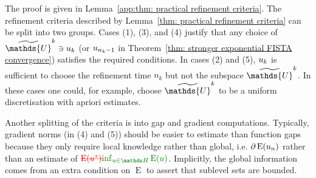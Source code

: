 \documentclass[smallextended]{svjour3}
\let\F\mathds\let\C\mathcal\newcommand{\R}{\F{R}}\newcommand{\A}{\tens{A}}
\newcommand{\op}[1]{\operatorname{#1}}
\newcommand{\1}{\F{1}}
\newcommand{\Emin}[1][\varf0]{\inf_{#1\in\F H}\op{E}(#1)}
\newcommand*{\varf}[1]{%
	\IfEqCase{#1}{%
		{0}{u}%
		{1}{v}%
		{2}{w}%
	}[u#1]%
}
\newcommand*{\spcf}[1]{%
	\IfEqCase{#1}{%
		{0}{\F{U}}%
		{1}{\F{V}}%
		{2}{\F{W}}%
	}[\F{U}#1]%
}
\newcommand{\edit}[2]{{\ifmmode\text{\color{red}\sout{\ensuremath{#1}}}\else {\color{red} \sout{#1}}\fi} {\color{darkgreen} #2}}
\begin{document}
	\noindent The proof is given in Lemma~\ref{app:thm: practical refinement criteria}. The refinement criteria described by Lemma~\ref{thm: practical refinement criteria} can be split into two groups. Cases (1), (3), and (4) justify that any choice of $\tilde{\spcf0}^k\ni\varf0_k$ (or $\varf0_{n_k-1}$ in Theorem~\ref{thm: stronger exponential FISTA convergence}) satisfies the required conditions. In cases (2) and (5), $\varf0_k$ is sufficient to choose the refinement time $n_k$ but not the subspace $\tilde{\spcf0}^k$. In these cases one could, for example, choose $\tilde{\spcf0}^k$ to be a uniform discretisation with apriori estimates.
	
	Another splitting of the criteria is into gap and gradient computations. Typically, gradient norms (in (4) and (5)) should be easier to estimate than function gaps because they only require local knowledge rather than global, i.e. $\partial\op{E}(\varf0_n)$ rather than an estimate of $\edit{\op{E}(\varf0^*)}{\Emin}$. Implicitly, the global information comes from an extra condition on $\op{E}$ to assert that sublevel sets are bounded.
	
\end{document}
